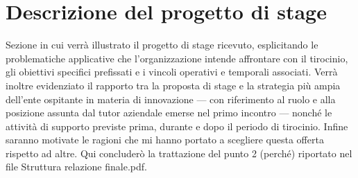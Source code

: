 \section{Descrizione del progetto di stage}

Sezione in cui verrà illustrato il progetto di stage ricevuto, esplicitando le problematiche applicative che l'organizzazione intende affrontare con il tirocinio, gli obiettivi specifici prefissati e i vincoli operativi e temporali associati. Verrà inoltre evidenziato il rapporto tra la proposta di stage e la strategia più ampia dell'ente ospitante in materia di innovazione — con riferimento al ruolo e alla posizione assunta dal tutor aziendale emerse nel primo incontro — nonché le attività di supporto previste prima, durante e dopo il periodo di tirocinio. Infine saranno motivate le ragioni che mi hanno portato a scegliere questa offerta rispetto ad altre.  
Qui concluderò la trattazione del punto 2 (perché) riportato nel file Struttura relazione finale.pdf.